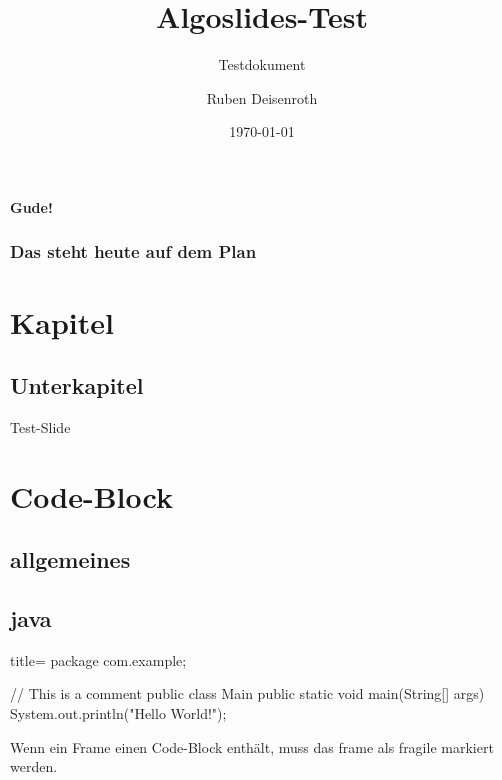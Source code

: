 \documentclass[
    ngerman,
    accentcolor=3b,
    dark_mode,
    fontsize=12pt,
    a4paper,
    aspectratio=169,
    colorback=true,
    fancy_row_colors,
    leqno,
    fleqn,
    boxarc,
    fleqn,
]{algoslides}
\title{Algoslides-Test}
\subtitle{Testdokument}
\author{Ruben Deisenroth}
\date{\today}
\begin{document}

    \maketitle{}

    \begin{frame}[c]
        \centering\huge\textbf{Gude!}
    \end{frame}

    \begin{frame}
        \frametitle{Das steht heute auf dem Plan}
        \tableofcontents[subsubsectionstyle=hide]
    \end{frame}


    \section{Kapitel}
    \subsection{Unterkapitel}

    \begin{frame}
        \slidehead{}
        Test-Slide
    \end{frame}

    \section{Code-Block} \subsection{allgemeines} \subsection{java}
    
    \begin{frame}[fragile,c]
        \slidehead{}
        \begin{codeBlock}[]{title=}
        package com.example;

        // This is a comment
        public class Main {
            public static void main(String[] args) {
                System.out.println("Hello World!");
            }
        }
    \end{codeBlock}
        \begin{defBox}
            Wenn ein Frame einen Code-Block enthält, muss das frame als fragile markiert werden.
        \end{defBox}
    \end{frame}
\end{document}
